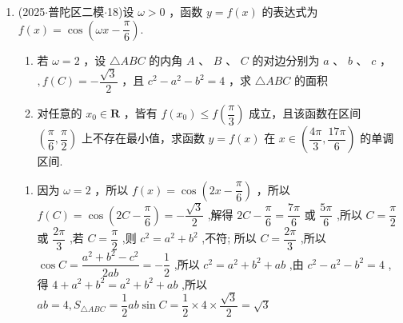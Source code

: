 \begin{enumerate}
\begin{jieda}
\begin{enumerate}
            \item 由 $f\left( x\right)  + f\left( {\dfrac{2\pi }{3} - x}\right)  = 0$ ，可知函数 $y = f\left( x\right)$ 关于点 $\left( {\dfrac{\pi }{3},0}\right)$ 对称. 因此 $\sin \left( \dfrac{\omega \pi }{3}\right)  = 0$ ,解得 $\omega  = {3k}$ ,其中 $k$ 为整数. 由于函数在区间 $\left( {-\dfrac{\pi }{8},0}\right)$ 上是严格增函数,所以 $\dfrac{T}{2} \geq  0 - \left( {-\dfrac{\pi }{8}}\right)  = \dfrac{\pi }{8}$ ,所以 $T = \dfrac{2\pi }{\omega } \geq  \dfrac{\pi }{4}$ ,结合 $\omega  = {3k}$ ,其中 $k$ 为整数,所以 $0 < \omega  \leq  8$ ,又 $\omega  = {3k}$ ,其中 $k$ 为整数,所以 $\omega  = 3$ 或 $\omega  = 6$ ,当 $\omega  = 6$ 时, $f\left( x\right)  = \sin \left( {6x}\right)$ ,函数在区间 $\left( {-\dfrac{\pi }{8},0}\right)$ 上不是严格增函数; 当 $\omega  = 3$ 时, $f\left( x\right)  = \sin \left( {3x}\right)$ ,函数在区间 $\left( {-\dfrac{\pi }{8},0}\right)$ 上是严格增函数,且关于点 $\left( {\dfrac{\pi }{3},0}\right)$ 对称. 所以 $\omega  = 3$ . 因此函数 $y = f\left( x\right)$ 的最小正周期为 $T = \dfrac{2\pi }{3}$ .
        \end{enumerate}
    \end{jieda}

    \item (2025$\cdot$普陀区二模$\cdot$18)设 $\omega  > 0$ ，函数 $y = f\left( x\right)$ 的表达式为 $f\left( x\right)  = \cos \left( {{\omega x} - \dfrac{\pi }{6}}\right)$.
    \begin{enumerate}
        \item 若 $\omega  = 2$ ，设 $\bigtriangleup  {ABC}$ 的内角 $A$ 、 $B$ 、 $C$ 的对边分别为 $a$ 、 $b$ 、 $c$ ， $,f\left( C\right)  =  - \dfrac{\sqrt{3}}{2}$ ，且 ${c}^{2} - {a}^{2} - {b}^{2} = 4$ ，求 $\bigtriangleup  {ABC}$ 的面积
        \item 对任意的 ${x}_{0} \in  \mathbf{R}$ ，皆有 $f\left( {x}_{0}\right)  \leq  f\left( \dfrac{\pi }{3}\right)$ 成立，且该函数在区间 $\left( {\dfrac{\pi }{6},\dfrac{\pi }{2}}\right)$ 上不存在最小值，求函数 $y = f\left( x\right)$ 在 $x \in  \left( {\dfrac{4\pi }{3},\dfrac{17\pi }{6}}\right)$ 的单调区间.
    \end{enumerate}
    \begin{jieda}
        \begin{enumerate}
            \item 因为 $\omega  = 2$ ，所以 $f\left( x\right)  = \cos \left( {{2x} - \dfrac{\pi }{6}}\right)$ ，所以 $f\left( C\right)  =  \cos \left( {{2C} - \dfrac{\pi }{6}}\right)  =  - \dfrac{\sqrt{3}}{2}$ ,解得 ${2C} - \dfrac{\pi }{6} = \dfrac{7\pi }{6}$ 或 $\dfrac{5\pi }{6}$ ,所以 $C = \dfrac{\pi }{2}$ 或 $\dfrac{2\pi }{3}$ ,若 $C = \dfrac{\pi }{2}$ ,则 ${c}^{2} = {a}^{2} + {b}^{2}$ ,不符; 所以 $C = \dfrac{2\pi }{3}$ ,所以 $\cos C = \dfrac{{a}^{2} + {b}^{2} - {c}^{2}}{2ab} =  - \dfrac{1}{2}$ ,所以 ${c}^{2} = {a}^{2} + {b}^{2} + {ab}$ ,由 ${c}^{2} -  {a}^{2} - {b}^{2} = 4$ ,得 $4 + {a}^{2} + {b}^{2} = {a}^{2} + {b}^{2} + {ab}$ ,所以 ${ab} = 4,{S}_{\bigtriangleup {ABC}} =  \dfrac{1}{2}{ab}\sin C = \dfrac{1}{2} \times  4 \times  \dfrac{\sqrt{3}}{2} = \sqrt{3}$
            

\end{enumerate}
\end{jieda}
\end{enumerate}
